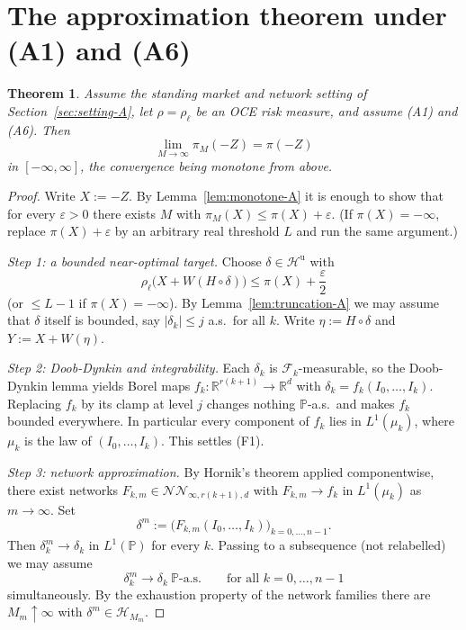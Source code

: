 \documentclass[11pt,a4paper]{report}
\numberwithin{equation}{chapter}
\theoremstyle{plain}
\newtheorem{theorem}[proposition]{Theorem}
\theoremstyle{definition}
\newcommand{\PP}{\mathbb{P}}
\newcommand{\R}{\mathbb{R}}
\newcommand{\F}{\mathcal{F}}
\newcommand{\HH}{\mathcal{H}}
\newcommand{\Hu}{\mathcal{H}^{\mathrm{u}}}
\newcommand{\NNet}{\mathcal{N\!N}}
\newcommand{\as}{\ \PP\text{-a.s.}}
\begin{document}
\section{The approximation theorem under (A1) and (A6)}\label{sec:main-A}

\begin{theorem}\label{thm:main-A}
    Assume the standing market and network setting of Section~\ref{sec:setting-A}, let $\rho=\rho_\ell$ be an OCE risk measure, and assume \textup{(A1)} and \textup{(A6)}. Then
    \[
        \lim_{M\to\infty}\pi_M(-Z)=\pi(-Z)
    \]
    in $[-\infty,\infty]$, the convergence being monotone from above.
\end{theorem}

\begin{proof}
    Write $X:=-Z$. By Lemma~\ref{lem:monotone-A} it is enough to show that for every $\varepsilon>0$ there exists $M$ with $\pi_M(X)\le\pi(X)+\varepsilon$. (If $\pi(X)=-\infty$, replace $\pi(X)+\varepsilon$ by an arbitrary real threshold $L$ and run the same argument.)

    \emph{Step 1: a bounded near-optimal target.} Choose $\delta\in\Hu$ with
    \[
        \rho_\ell\bigl(X+W(H\circ\delta)\bigr)\le\pi(X)+\frac{\varepsilon}{2}
    \]
    (or $\le L-1$ if $\pi(X)=-\infty$). By Lemma~\ref{lem:truncation-A} we may assume that $\delta$ itself is bounded, say $|\delta_k|\le j$ a.s.\ for all $k$. Write $\eta:=H\circ\delta$ and $Y:=X+W(\eta)$.

    \emph{Step 2: Doob-Dynkin and integrability.} Each $\delta_k$ is $\F_k$-measurable, so the Doob-Dynkin lemma yields Borel maps $f_k\colon\R^{r(k+1)}\to\R^d$ with $\delta_k=f_k(I_0,\dots,I_k)$. Replacing $f_k$ by its clamp at level $j$ changes nothing $\PP$-a.s.\ and makes $f_k$ bounded everywhere. In particular every component of $f_k$ lies in $L^1(\mu_k)$, where $\mu_k$ is the law of $(I_0,\dots,I_k)$. This settles (F1).

    \emph{Step 3: network approximation.} By Hornik's theorem applied componentwise, there exist networks $F_{k,m}\in\NNet_{\infty,r(k+1),d}$ with $F_{k,m}\to f_k$ in $L^1(\mu_k)$ as $m\to\infty$. Set
    \[
        \delta^m:=\bigl(F_{k,m}(I_0,\dots,I_k)\bigr)_{k=0,\dots,n-1}.
    \]
    Then $\delta^m_k\to\delta_k$ in $L^1(\PP)$ for every $k$. Passing to a subsequence (not relabelled) we may assume
    \[
        \delta^m_k\longrightarrow\delta_k\as\qquad\text{for all }k=0,\dots,n-1
    \]
    simultaneously. By the exhaustion property of the network families there are $M_m\uparrow\infty$ with $\delta^m\in\HH_{M_m}$.


\end{proof}
\end{document}
